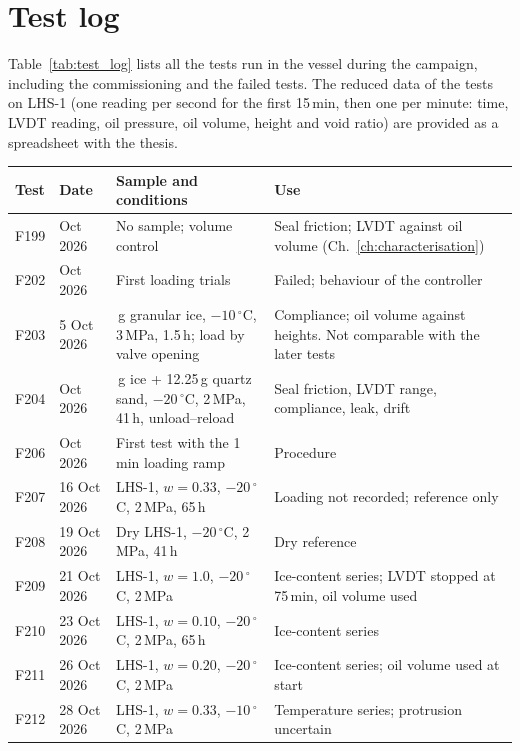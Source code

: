 \chapter{Test log}
\label{app:tests}%

Table~\ref{tab:test_log} lists all the tests run in the vessel during the campaign, including the commissioning and the failed tests. The reduced data of the tests on LHS-1 (one reading per second for the first 15\,min, then one per minute: time, LVDT reading, oil pressure, oil volume, height and void ratio) are provided as a spreadsheet with the thesis.

\begin{table}[H]
\centering
\footnotesize
\setlength{\tabcolsep}{4pt}
\begin{tabularx}{\textwidth}{@{}l l >{\raggedright\arraybackslash}X >{\raggedright\arraybackslash}X@{}}
\toprule
Test & Date & Sample and conditions & Use \\
\midrule
F199 & Oct 2026 & No sample; volume control & Seal friction; LVDT against oil volume (Ch.~\ref{ch:characterisation}) \\
F202 & Oct 2026 & First loading trials & Failed; behaviour of the controller \\
F203 & 5 Oct 2026 & 18\,g granular ice, $-10\,^\circ$C, 3\,MPa, 1.5\,h; load by valve opening & Compliance; oil volume against heights. Not comparable with the later tests \\
F204 & Oct 2026 & 12.25\,g ice + 12.25\,g quartz sand, $-20\,^\circ$C, 2\,MPa, 41\,h, unload--reload & Seal friction, LVDT range, compliance, leak, drift \\
F206 & Oct 2026 & First test with the 1\,min loading ramp & Procedure \\
F207 & 16 Oct 2026 & LHS-1, $w = 0.33$, $-20\,^\circ$C, 2\,MPa, 65\,h & Loading not recorded; reference only \\
F208 & 19 Oct 2026 & Dry LHS-1, $-20\,^\circ$C, 2\,MPa, 41\,h & Dry reference \\
F209 & 21 Oct 2026 & LHS-1, $w = 1.0$, $-20\,^\circ$C, 2\,MPa & Ice-content series; LVDT stopped at 75\,min, oil volume used \\
F210 & 23 Oct 2026 & LHS-1, $w = 0.10$, $-20\,^\circ$C, 2\,MPa, 65\,h & Ice-content series \\
F211 & 26 Oct 2026 & LHS-1, $w = 0.20$, $-20\,^\circ$C, 2\,MPa & Ice-content series; oil volume used at start \\
F212 & 28 Oct 2026 & LHS-1, $w = 0.33$, $-10\,^\circ$C, 2\,MPa & Temperature series; protrusion uncertain \\

\end{tabularx}
\end{table}
